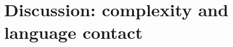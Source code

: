 \documentclass[output=paper,
modfonts
]{langscibook}
\begin{document}
%  
% 
% 
% 
% 
% 
% 
% 
% 
% 
%   
%   
% 
\section{Discussion: complexity and language contact}\label{sec:6:jerro}
\end{document}

